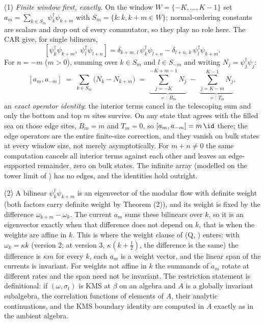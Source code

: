 (1) \emph{Finite window first, exactly.} On the window $W = \{-K, \dots, K-1\}$ set $a_m = \sum_{k \in S_m} \psi^\dagger_k \psi_{k+m}$ with $S_m = \{k : k, k+m \in W\}$; normal-ordering constants are scalars and drop out of every commutator, so they play no role here. The CAR give, for single bilinears,
\[
[\psi^\dagger_k \psi_{k+m},\; \psi^\dagger_l \psi_{l+n}] = \delta_{k+m,\,l}\,\psi^\dagger_k\psi_{l+n} - \delta_{l+n,\,k}\,\psi^\dagger_l\psi_{k+m} .
\]
For $n = -m$ ($m > 0$), summing over $k \in S_m$ and $l \in S_{-m}$ and writing $N_j = \psi^\dagger_j\psi_j$:
\[
[a_m, a_{-m}] \;=\; \sum_{k \in S_m} \bigl(N_k - N_{k+m}\bigr)
\;=\; \underbrace{\sum_{j=-K}^{-K+m-1} N_j}_{=:\,B_m} \;-\; \underbrace{\sum_{j=K-m}^{K-1} N_j}_{=:\,T_m} ,
\]
an \emph{exact operator identity}: the interior terms cancel in the telescoping sum and only the bottom and top $m$ sites survive. On any state that agrees with the filled sea on those edge sites, $B_m = m$ and $T_m = 0$, so $[a_m, a_{-m}] = m\,\id$ there; the edge operators are the entire finite-size correction, and they vanish on bulk states at every window size, not merely asymptotically. For $m + n \neq 0$ the same computation cancels all interior terms against each other and leaves an edge-supported remainder, zero on bulk states. The infinite array (modelled on the tower limit of \cite[Thm.~5.6]{ButlerT3}) has no edges, and the identities hold outright.

(2) A bilinear $\psi^\dagger_k\psi_{k+m}$ is an eigenvector of the modular flow with definite weight (both factors carry definite weight by Theorem (2)), and its weight is fixed by the difference $\omega_{k+m} - \omega_k$. The current $a_m$ sums these bilinears over $k$, so it is an eigenvector exactly when that difference does not depend on $k$, that is when the weights are affine in $k$. This is where the weight clause of (Q, ) enters: with $\omega_k = \kappa k$ (version 2; at version 3, $\kappa(k + \tfrac12)$, the difference is the same) the difference is $\kappa m$ for every $k$, each $a_m$ is a weight vector, and the linear span of the currents is invariant. For weights not affine in $k$ the summands of $a_m$ rotate at different rates and the span need not be invariant. The restriction statement is definitional: if $(\omega, \sigma_t)$ is KMS at $\beta$ on an algebra and $A$ is a globally invariant subalgebra, the correlation functions of elements of $A$, their analytic continuations, and the KMS boundary identity are computed in $A$ exactly as in the ambient algebra.

